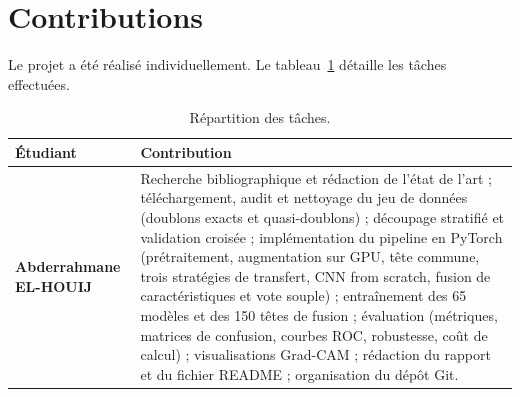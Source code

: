 \section*{Contributions}
\label{sec:contributions}

Le projet a été réalisé individuellement. Le tableau~\ref{tab:contrib} détaille les tâches effectuées.

\begin{table}[htbp]
\centering
\caption{Répartition des tâches.}
\label{tab:contrib}
\begin{tabularx}{\textwidth}{>{\bfseries}l X}
\toprule
\textbf{Étudiant} & \textbf{Contribution} \\
\midrule
Abderrahmane EL-HOUIJ &
Recherche bibliographique et rédaction de l'état de l'art ; téléchargement, audit et nettoyage du jeu de données (doublons exacts et quasi-doublons) ; découpage stratifié et validation croisée ; implémentation du pipeline en PyTorch (prétraitement, augmentation sur GPU, tête commune, trois stratégies de transfert, CNN from scratch, fusion de caractéristiques et vote souple) ; entraînement des 65 modèles et des 150 têtes de fusion ; évaluation (métriques, matrices de confusion, courbes ROC, robustesse, coût de calcul) ; visualisations Grad-CAM ; rédaction du rapport et du fichier README ; organisation du dépôt Git. \\
\bottomrule
\end{tabularx}
\end{table}
